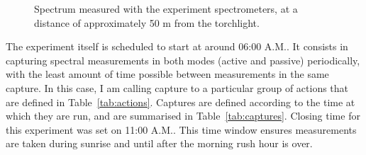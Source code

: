 \begin{figure}[htpb]
\begin{minipage}{.45\textwidth}
        \caption{Spectrum measured with the experiment spectrometers, at
        a distance of approximately 50 m from the torchlight.}
        \label{fig:measured_led_spectrum}
    \end{minipage}
\end{figure}

\begin{table}[htpb]
    \centering
    \caption{Summary table for the two experiment assemblies. Note the
    difference in terms of material, due to the two different roles both
    assemblies play during the experiment. This is translated into not
    having the need of an artificial light source in the West Bank's
    assembly.}
    \label{tab:assemblies}
\end{table}

The experiment itself is scheduled to start at around 06:00 A.M.. It
consists in capturing spectral measurements in both modes (active and
passive) periodically, with the least amount of time possible between
measurements in the same capture. In this case, I am calling capture to
a particular group of actions that are defined in
Table~\ref{tab:actions}. Captures are defined according to the time at
which they are run, and are summarised in Table~\ref{tab:captures}.
Closing time for this experiment was set on 11:00 A.M.. This time window
ensures measurements are taken during sunrise and until after the
morning rush hour is over.

